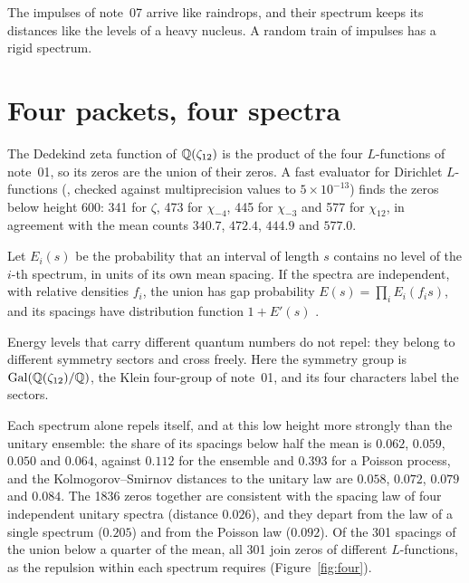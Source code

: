 \documentclass[11pt]{article}
\begin{document}
\physical
The impulses of note~07 arrive like raindrops, and their spectrum keeps its distances like the levels of a heavy nucleus.
A random train of impulses has a rigid spectrum.

\section{Four packets, four spectra}

The Dedekind zeta function of $\mathbb{Q}(\zeta_{12})$ is the product of the four $L$-functions of note~01, so its zeros are the union of their zeros.
A fast evaluator for Dirichlet $L$-functions (, checked against multiprecision values to $5\times10^{-13}$) finds the zeros below height 600: 341 for $\zeta$, 473 for $\chi_{-4}$, 445 for $\chi_{-3}$ and 577 for $\chi_{12}$, in agreement with the mean counts $340.7$, $472.4$, $444.9$ and $577.0$.

\begin{derivation}\label{d:super}
Let $E_i(s)$ be the probability that an interval of length $s$ contains no level of the $i$-th spectrum, in units of its own mean spacing.
If the spectra are independent, with relative densities $f_i$, the union has gap probability $E(s) = \prod_i E_i(f_is)$, and its spacings have distribution function $1 + E'(s)$ \cite{BerryRobnik}.
\end{derivation}

\physical
Energy levels that carry different quantum numbers do not repel: they belong to different symmetry sectors and cross freely.
Here the symmetry group is $\mathrm{Gal}(\mathbb{Q}(\zeta_{12})/\mathbb{Q})$, the Klein four-group of note~01, and its four characters label the sectors.

Each spectrum alone repels itself, and at this low height more strongly than the unitary ensemble: the share of its spacings below half the mean is $0.062$, $0.059$, $0.050$ and $0.064$, against $0.112$ for the ensemble and $0.393$ for a Poisson process, and the Kolmogorov--Smirnov distances to the unitary law are $0.058$, $0.072$, $0.079$ and $0.084$.
The 1836 zeros together are consistent with the spacing law of four independent unitary spectra (distance $0.026$), and they depart from the law of a single spectrum ($0.205$) and from the Poisson law ($0.092$).
Of the 301 spacings of the union below a quarter of the mean, all 301 join zeros of different $L$-functions, as the repulsion within each spectrum requires (Figure~\ref{fig:four}).
\end{document}
